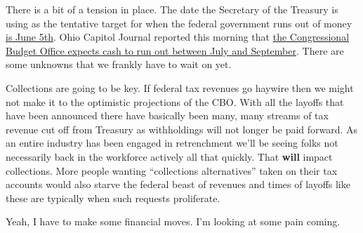 There is a bit of a tension in place. The date the Secretary of the
Treasury is using as the tentative target for when the federal
government runs out of money
\href{https://home.treasury.gov/news/press-releases/jy1196}{is June
5th}. Ohio Capitol Journal reported this morning that
\href{https://ohiocapitaljournal.com/2023/02/16/u-s-likely-to-default-on-debt-between-july-and-september-unless-congress-acts-cbo-says/}{the
Congressional Budget Office expects cash to run out between July and
September}. There are some unknowns that we frankly have to wait on yet.

Collections are going to be key. If federal tax revenues go haywire then
we might not make it to the optimistic projections of the CBO. With all
the layoffs that have been announced there have basically been many,
many streams of tax revenue cut off from Treasury as withholdings will
not longer be paid forward. As an entire industry has been engaged in
retrenchment we'll be seeing folks not necessarily back in the workforce
actively all that quickly. That \textbf{will} impact collections. More
people wanting ``collections alternatives'' taken on their tax accounts
would also starve the federal beast of revenues and times of layoffs
like these are typically when such requests proliferate.

Yeah, I have to make some financial moves. I'm looking at some pain
coming.
